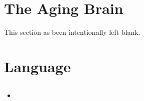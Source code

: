 \documentclass[12pt,a4paper]{article}
\begin{document}
\section{The Aging Brain}
This section as been intentionally left blank.

\clearpage
{}
\clearpage
\section{Language}
\subsection{}
\begin{itemize}
    \item 
\end{itemize}

\end{document}
